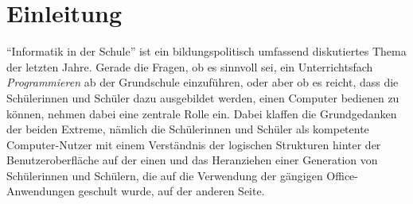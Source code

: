 \documentclass[paper=a4, pagesize, DIV=calc, BCOR=15mm, twoside=on, onecolumn=on, open = right, titlepage =on, parskip =half-, headsepline = on, footsepline = on, chapterprefix = on, appendixprefix = off, fontsize = 12pt, numbers = noenddot, abstract = on]{scrbook}
\numberwithin{equation}{chapter}
\theoremstyle{definition}
\theoremstyle{plain}
\theoremstyle{plain}
\theoremstyle{remark}
\theoremstyle{plain}
\theoremstyle{plain}
\begin{document}
\newpage
\thispagestyle{plain}

\newcommand*\diff{\mathop{}\!\mathrm{d}}



\thispagestyle{empty}
\cleardoublepage



\newpage
\listoffigures
\newpage
\tableofcontents
\thispagestyle{empty}
\cleardoublepage
\newpage
{}
\par \singlespacing
\chapter{Einleitung}
\onehalfspacing
"`Informatik in der Schule"' ist ein bildungspolitisch umfassend diskutiertes Thema der letzten Jahre. Gerade die Fragen, ob es sinnvoll sei, ein Unterrichtsfach \emph{Programmieren} ab der Grundschule einzuführen, oder aber ob es reicht, dass die Schülerinnen und Schüler dazu ausgebildet werden, einen Computer bedienen zu können, nehmen dabei eine zentrale Rolle ein. Dabei klaffen die Grundgedanken der beiden Extreme, nämlich die Schülerinnen und Schüler als kompetente Computer-Nutzer mit einem Verständnis der logischen Strukturen hinter der Benutzeroberfläche auf der einen und das Heranziehen einer Generation von Schülerinnen und Schülern, die auf die Verwendung der gängigen Office-Anwendungen geschult wurde, auf der anderen Seite.
\end{document}
